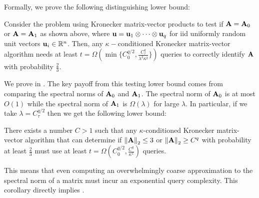 Formally, we prove the following distinguishing lower bound:
\begin{theorem}
    \label{thm:kron-matvec-testing-lower}
    Consider the problem using Kronecker matrix-vector products to test if \(\mathbf{A} = \mathbf{A}_0\) or \(\mathbf{A} = \mathbf{A}_1\) as shown above, where \(\boldsymbol{\mathrm{u}} = \boldsymbol{\mathrm{u}}_1 \otimes \cdots \otimes \boldsymbol{\mathrm{u}}_q\) for iid uniformly random unit vectors \(\boldsymbol{\mathrm{u}}_i \in {\mathbb R}^n\).
    Then, any \(\kappa-\)conditioned Kronecker matrix-vector algorithm needs at least \(t = \Omega(\min\{C_0^{q/2}, \frac{C_\tau^q}{\lambda^2\kappa^2}\})\) queries to correctly identify \(\mathbf{A}\) with probability \(\frac{2}{3}\).
\end{theorem}
We prove  in .
The key payoff from this testing lower bound comes from comparing the spectral norms of \(\mathbf{A}_0\) and \(\mathbf{A}_1\).
The spectral norm of \(\mathbf{A}_0\) is at most \(O(1)\) while the spectral norm of \(\mathbf{A}_1\) is \(\Omega(\lambda)\) for large \(\lambda\).
In particular, if we take \(\lambda = C_\tau^{q/2}\) then we get the following lower bound:
\begin{corollary}
    \label{corol}
    There exists a number \(C>1\) such that any \(\kappa\)-conditioned Kronecker matrix-vector algorithm that can determine if \(\norm{\mA}_2 \leq 3\) or \(\norm{\mA}_2 \geq C^q\) with probability at least \(\frac23\) must use at least \(t = \Omega(C_0^{q/2}, \frac{C^{q}}{\kappa^2})\) queries.
\end{corollary}
This means that even computing an overwhelmingly coarse approximation to the spectral norm of a matrix must incur an exponential query complexity.
This corollary directly implies .

